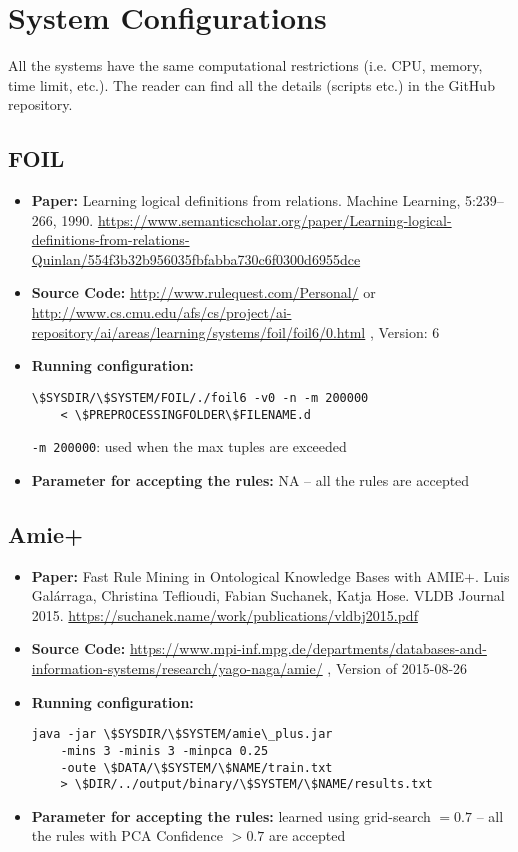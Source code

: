 \documentclass[letterpaper]{article} \usepackage{aaai20}  \usepackage{times}  \usepackage{helvet} \usepackage{courier}  \usepackage[hyphens]{url}  \usepackage{graphicx} \urlstyle{rm} \def\UrlFont{\rm}  \usepackage{graphicx}  \frenchspacing  \setlength{\pdfpagewidth}{8.5in}  \setlength{\pdfpageheight}{11in}  \usepackage{amsthm}
\theoremstyle{definition}
\newcommand{\tool}{\text{RuDaS}\xspace}
\begin{document}
\clearpage
\newpage
\appendix 
\setcounter{secnumdepth}{1}

\section{System Configurations}
All the systems have the same computational restrictions (i.e. CPU, memory, time limit, etc.). The reader can find all the details (scripts etc.) in the \tool GitHub repository.


\subsection{FOIL}
\begin{itemize}
\item {\bf Paper:} Learning logical definitions from relations. Machine Learning, 5:239–266, 1990. \url{https://www.semanticscholar.org/paper/Learning-logical-definitions-from-relations-Quinlan/554f3b32b956035fbfabba730c6f0300d6955dce}
\item {\bf Source Code:} \url{http://www.rulequest.com/Personal/} or \url{http://www.cs.cmu.edu/afs/cs/project/ai-repository/ai/areas/learning/systems/foil/foil6/0.html} ,
Version: 6
\item {\bf Running configuration:}
\begin{lstlisting}[basicstyle=\ttfamily\scriptsize,showstringspaces=false]
 \$SYSDIR/\$SYSTEM/FOIL/./foil6 -v0 -n -m 200000
    < \$PREPROCESSINGFOLDER\$FILENAME.d
 \end{lstlisting}
\texttt{-m 200000}: used when the max tuples are exceeded
\item {\bf Parameter for accepting the rules:} NA -- all the rules are accepted
\end{itemize}

\subsection{Amie+}
\begin{itemize}
\item {\bf Paper:} Fast Rule Mining in Ontological Knowledge Bases with AMIE+. Luis Galárraga, Christina Teflioudi, Fabian Suchanek, Katja Hose. VLDB Journal 2015. 
\url{https://suchanek.name/work/publications/vldbj2015.pdf}
\item {\bf Source Code:} \url{https://www.mpi-inf.mpg.de/departments/databases-and-information-systems/research/yago-naga/amie/} , Version of 2015-08-26
\item {\bf Running configuration:}
\begin{lstlisting}[basicstyle=\ttfamily\scriptsize,showstringspaces=false]
java -jar \$SYSDIR/\$SYSTEM/amie\_plus.jar 
    -mins 3 -minis 3 -minpca 0.25 
    -oute \$DATA/\$SYSTEM/\$NAME/train.txt 
    > \$DIR/../output/binary/\$SYSTEM/\$NAME/results.txt
\end{lstlisting}
\item {\bf Parameter for accepting the rules:} learned using grid-search $=0.7$ -- all the rules with PCA Confidence $> 0.7$ are accepted
\end{itemize}
\end{document}

